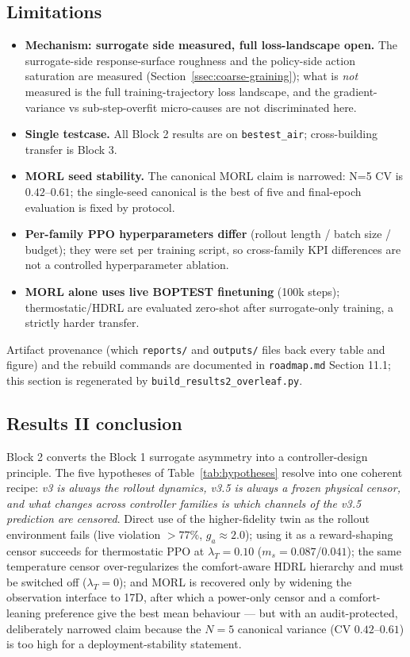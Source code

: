 \documentclass[11pt,a4paper]{article}
\begin{document}
\subsection{Limitations}

\begin{itemize}
  \item \textbf{Mechanism: surrogate side measured, full loss-landscape open.} The surrogate-side response-surface roughness and the policy-side action saturation are measured (Section~\ref{ssec:coarse-graining}); what is \emph{not} measured is the full training-trajectory loss landscape, and the gradient-variance vs sub-step-overfit micro-causes are not discriminated here.
  \item \textbf{Single testcase.} All Block 2 results are on \texttt{bestest\_air}; cross-building transfer is Block 3.
  \item \textbf{MORL seed stability.} The canonical MORL claim is narrowed: N=5 CV is $0.42$--$0.61$; the single-seed canonical is the best of five and final-epoch evaluation is fixed by protocol.
  \item \textbf{Per-family PPO hyperparameters differ} (rollout length / batch size / budget); they were set per training script, so cross-family KPI differences are not a controlled hyperparameter ablation.
  \item \textbf{MORL alone uses live BOPTEST finetuning} (100k steps); thermostatic/HDRL are evaluated zero-shot after surrogate-only training, a strictly harder transfer.
\end{itemize}

Artifact provenance (which \texttt{reports/} and \texttt{outputs/} files back every table and figure) and the rebuild commands are documented in \texttt{roadmap.md} Section 11.1; this section is regenerated by \texttt{build\_results2\_overleaf.py}.

\subsection{Results II conclusion}

Block 2 converts the Block 1 surrogate asymmetry into a controller-design principle. The five hypotheses of Table~\ref{tab:hypotheses} resolve into one coherent recipe: \emph{v3 is always the rollout dynamics, v3.5 is always a frozen physical censor, and what changes across controller families is which channels of the v3.5 prediction are censored}. Direct use of the higher-fidelity twin as the rollout environment fails (live violation $>77\%$, $g_a\approx2.0$); using it as a reward-shaping censor succeeds for thermostatic PPO at $\lambda_T=0.10$ ($m_s=0.087$/$0.041$); the same temperature censor over-regularizes the comfort-aware HDRL hierarchy and must be switched off ($\lambda_T=0$); and MORL is recovered only by widening the observation interface to 17D, after which a power-only censor and a comfort-leaning preference give the best mean behaviour --- but with an audit-protected, deliberately narrowed claim because the $N=5$ canonical variance (CV $0.42$--$0.61$) is too high for a deployment-stability statement.
\end{document}

